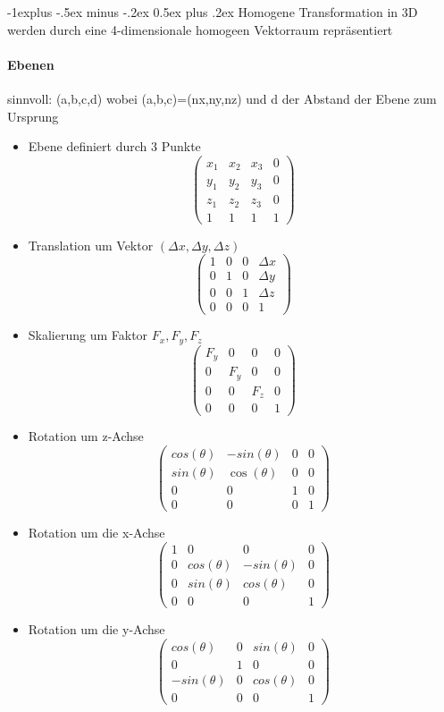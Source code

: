 \documentclass[10pt,landscape]{article}
\makeatletter
\renewcommand{\subsection}{\@startsection{subsection}{2}{0mm}%
                                {-1explus -.5ex minus -.2ex}%
                                {0.5ex plus .2ex}%
                                {\normalfont\normalsize\bfseries}}
\makeatother
\begin{document}
\begin{multicols}{3}
\subsection{ Homogene Transformation in 3D}
werden durch eine 4-dimensionale homogeen Vektorraum repräsentiert

\paragraph{Ebenen}
sinnvoll: (a,b,c,d) wobei (a,b,c)=(nx,ny,nz) und d der Abstand der Ebene zum Ursprung
\begin{itemize}
  \item Ebene definiert durch 3 Punkte
   $$\begin{pmatrix}
    x_1 & x_2 & x_3 & 0\\
    y_1 & y_2 & y_3 & 0\\ 
    z_1 & z_2 & z_3 & 0\\
    1 & 1 & 1 & 1
    \end{pmatrix}$$
  \item Translation um Vektor $(\Delta x, \Delta y,\Delta z)$
   $$\begin{pmatrix}
    1 & 0 & 0 & \Delta x\\
    0 & 1 & 0 & \Delta y\\ 
    0 & 0 & 1 & \Delta z\\
    0 & 0 & 0 & 1
    \end{pmatrix}$$
  \item Skalierung um Faktor $F_x,F_y,F_z$
   $$\begin{pmatrix}
    F_y & 0 & 0 & 0\\
    0 & F_y & 0 & 0\\ 
    0 & 0 & F_z & 0\\
    0 & 0 & 0 & 1
    \end{pmatrix}$$
  \item Rotation um z-Achse
   $$\begin{pmatrix}
    cos(\theta) & -sin(\theta) & 0 & 0\\
    sin(\theta) & \cos(\theta) & 0 & 0\\ 
    0 & 0 & 1 & 0\\
    0 & 0 & 0 & 1
    \end{pmatrix}$$
  \item Rotation um die x-Achse
   $$\begin{pmatrix}
    1 & 0 & 0 & 0\\
    0 & cos(\theta) & -sin(\theta) & 0\\ 
    0 & sin(\theta) & cos(\theta) & 0\\
    0 & 0 & 0 & 1
    \end{pmatrix}$$
  \item Rotation um die y-Achse
   $$\begin{pmatrix}
    cos(\theta) & 0 & sin(\theta) & 0\\
    0 & 1 & 0 & 0\\ 
    -sin(\theta) & 0 & cos(\theta) & 0\\
    0 & 0 & 0 & 1
    \end{pmatrix}$$
  \end{itemize}


\end{multicols}
\end{document}
